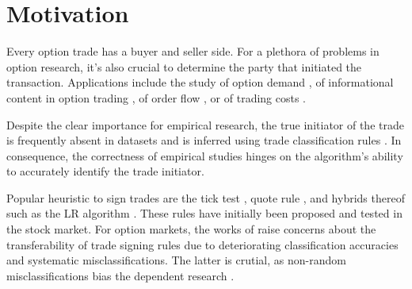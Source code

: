 

\section{Motivation}

Every option trade has a buyer and seller side. For a plethora of problems in option research, it’s also crucial to determine the party that initiated the transaction. Applications include the study of option demand \autocite[][]{garleanuDemandBasedOptionPricing2009}, of informational content in option trading \autocites[][]{huDoesOptionTrading2014}[][]{panInformationOptionVolume2006}[][]{caoInformationalContentOption2005}, of order flow \autocite[][]{muravyevOrderFlowExpected2016}, or of trading costs \autocite[][]{muravyevOptionsTradingCosts2020}. 

Despite the clear importance for empirical research, the true initiator of the trade is frequently absent in datasets and is inferred using trade classification rules \autocite[][]{easleyOptionVolumeStock1998}. In consequence, the correctness of empirical studies hinges on the algorithm's ability to accurately identify the trade initiator.

Popular heuristic to sign trades are the tick test \autocite[][]{hasbrouckTradesQuotesInventories1988}, quote rule \autocite[][]{harrisDayEndTransactionPrice1989}, and hybrids thereof such as the \gls{LR} algorithm \autocite[][]{leeInferringTradeDirection1991}. These rules have initially been proposed and tested in the stock market. For option markets, the works of \textcites[][]{savickasInferringDirectionOption2003}[][]{grauerOptionTradeClassification2022} raise concerns about the transferability of trade signing rules due to deteriorating classification accuracies and systematic misclassifications. The latter is crutial, as non-random misclassifications bias the dependent research \autocites[][]{odders-whiteOccurrenceConsequencesInaccurate2000}[][]{theissenTestAccuracyLee2001}.

